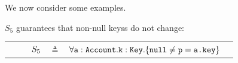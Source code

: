 We now consider some examples.

%  

{
 \begin{example}
 \label{example:twostate}
 $S_5$  guarantees   that   non-null keyss do not change:
 \\
 \begin{tabular}{lcll}
$\strut \ \ \ \ \ \ \ \ S_5$ & $\triangleq$   & ${\forall {\mbox{\normalfont{\texttt{a}}}:\mbox{\normalfont{\texttt{Account}}}.\mbox{\normalfont{\texttt{k}}}:\mbox{\normalfont{\texttt{Key}}}}.{{\{}}{\mbox{\normalfont{\texttt{null}}}\neq \mbox{\normalfont{\texttt{p}}}=\mbox{\normalfont{\texttt{a.key}}}}{{\}}}} $  \end{tabular}
 \end{example} 
 }
